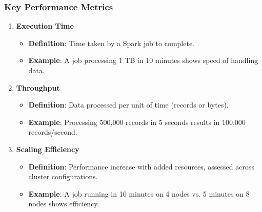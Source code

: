 \documentclass[aspectratio=169]{beamer}
\begin{document}
\begin{frame}[fragile]
  \frametitle{Key Performance Metrics}
  \begin{enumerate}
    \item \textbf{Execution Time}
      \begin{itemize}
        \item \textbf{Definition}: Time taken by a Spark job to complete.
        \item \textbf{Example}: A job processing 1 TB in 10 minutes shows speed of handling data.
      \end{itemize}

    \item \textbf{Throughput}
      \begin{itemize}
        \item \textbf{Definition}: Data processed per unit of time (records or bytes).
        \item \textbf{Example}: Processing 500,000 records in 5 seconds results in 100,000 records/second.
      \end{itemize}

    \item \textbf{Scaling Efficiency}
      \begin{itemize}
        \item \textbf{Definition}: Performance increase with added resources, assessed across cluster configurations.
        \item \textbf{Example}: A job running in 10 minutes on 4 nodes vs. 5 minutes on 8 nodes shows efficiency.
      \end{itemize}
  \end{enumerate}
\end{frame}
\end{document}
